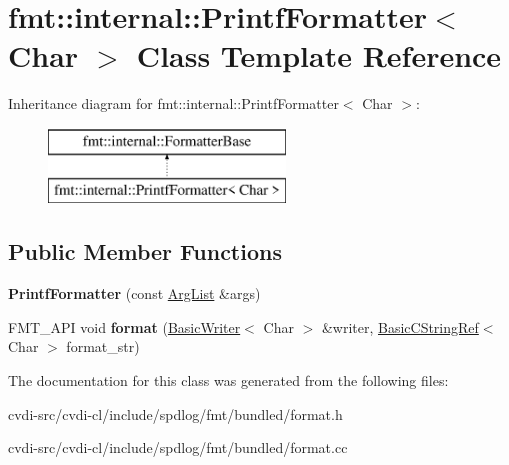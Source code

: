 \hypertarget{classfmt_1_1internal_1_1PrintfFormatter}{}\section{fmt\+:\+:internal\+:\+:Printf\+Formatter$<$ Char $>$ Class Template Reference}
\label{classfmt_1_1internal_1_1PrintfFormatter}
Inheritance diagram for fmt\+:\+:internal\+:\+:Printf\+Formatter$<$ Char $>$\+:\begin{figure}[H]
\begin{center}
\leavevmode
\includegraphics[height=2.000000cm]{classfmt_1_1internal_1_1PrintfFormatter}
\end{center}
\end{figure}
\subsection*{Public Member Functions}
\begin{DoxyCompactItemize}
\item 
{\bfseries Printf\+Formatter} (const \hyperlink{classfmt_1_1ArgList}{Arg\+List} \&args)\hypertarget{classfmt_1_1internal_1_1PrintfFormatter_a4477dcf12266b16a27077ec4fdc20f45}{}\label{classfmt_1_1internal_1_1PrintfFormatter_a4477dcf12266b16a27077ec4fdc20f45}

\item 
F\+M\+T\+\_\+\+A\+PI void {\bfseries format} (\hyperlink{classfmt_1_1BasicWriter}{Basic\+Writer}$<$ Char $>$ \&writer, \hyperlink{classfmt_1_1BasicCStringRef}{Basic\+C\+String\+Ref}$<$ Char $>$ format\+\_\+str)\hypertarget{classfmt_1_1internal_1_1PrintfFormatter_a8b87898afca8f347fe5242f6d2b0ac60}{}\label{classfmt_1_1internal_1_1PrintfFormatter_a8b87898afca8f347fe5242f6d2b0ac60}

\end{DoxyCompactItemize}


The documentation for this class was generated from the following files\+:\begin{DoxyCompactItemize}
\item 
cvdi-\/src/cvdi-\/cl/include/spdlog/fmt/bundled/format.\+h\item 
cvdi-\/src/cvdi-\/cl/include/spdlog/fmt/bundled/format.\+cc\end{DoxyCompactItemize}
